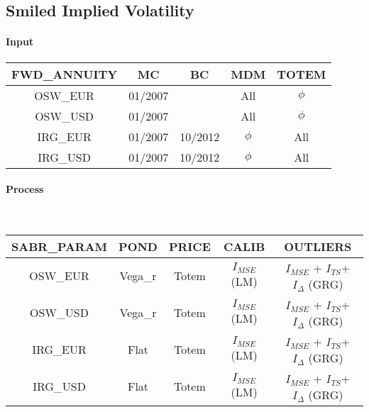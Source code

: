 \documentclass[3pt]{article}
\begin{document}
\bigskip {}

\subsection{Smiled Implied Volatility}

\paragraph{Input}

\qquad \bigskip 
\begin{tabular}{|c|c|c|c|c|}
\hline
FWD\_ANNUITY & MC & BC & MDM & TOTEM \\ \hline
OSW\_EUR & 01/2007 &  & All & $\phi $ \\ \hline
OSW\_USD & 01/2007 &  & All & $\phi $ \\ \hline
IRG\_EUR & 01/2007 & 10/2012 & $\phi $ & All \\ \hline
IRG\_USD & 01/2007 & 10/2012 & $\phi $ & All \\ \hline
\end{tabular}

\paragraph{Process}

\ 
\begin{tabular}{|c|c|c|c|c|}
\hline
SABR\_PARAM & POND & PRICE & CALIB & OUTLIERS \\ \hline
OSW\_EUR & Vega\_r & Totem & $I_{MSE}$ (LM) & $I_{MSE}$ + $I_{TS}$+ $%
I_{\Delta }$ (GRG) \\ \hline
OSW\_USD & Vega\_r & Totem & $I_{MSE}$ (LM) & $I_{MSE}$ + $I_{TS}$+ $%
I_{\Delta }$ (GRG) \\ \hline
IRG\_EUR & Flat & Totem & $I_{MSE}$ (LM) & $I_{MSE}$ + $I_{TS}$+ $I_{\Delta
} $ (GRG) \\ \hline
IRG\_USD & Flat & Totem & $I_{MSE}$ (LM) & $I_{MSE}$ + $I_{TS}$+ $I_{\Delta
} $ (GRG) \\ \hline
\end{tabular}

\bigskip
\end{document}
